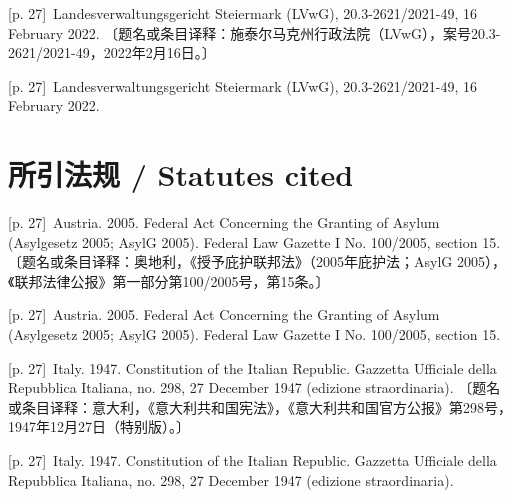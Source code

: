 \documentclass[10pt,a4paper]{article}
\begin{document}
\noindent\begin{minipage}{\textwidth}\begin{minipage}[t]{\dimexpr.5\textwidth-4mm\relax}{\scriptsize\color{gray} [p. 27]}\ Landesverwaltungsgericht Steiermark (LVwG), 20.3-2621/2021-49, 16 February 2022. 〔题名或条目译释：施泰尔马克州行政法院（LVwG），案号20.3-2621/2021-49，2022年2月16日。〕\par\end{minipage}\hfill\begin{minipage}[t]{\dimexpr.5\textwidth-4mm\relax}{\scriptsize\color{gray} [p. 27]}\ Landesverwaltungsgericht Steiermark (LVwG), 20.3-2621/2021-49, 16 February 2022.\par\end{minipage}\end{minipage}\par
{}\section*{所引法规 / Statutes cited}
\noindent\begin{minipage}{\textwidth}\begin{minipage}[t]{\dimexpr.5\textwidth-4mm\relax}{\scriptsize\color{gray} [p. 27]}\ Austria. 2005. Federal Act Concerning the Granting of Asylum (Asylgesetz 2005; AsylG 2005). Federal Law Gazette I No. 100/2005, section 15. 〔题名或条目译释：奥地利，《授予庇护联邦法》（2005年庇护法；AsylG 2005），《联邦法律公报》第一部分第100/2005号，第15条。〕\par\end{minipage}\hfill\begin{minipage}[t]{\dimexpr.5\textwidth-4mm\relax}{\scriptsize\color{gray} [p. 27]}\ Austria. 2005. Federal Act Concerning the Granting of Asylum (Asylgesetz 2005; AsylG 2005). Federal Law Gazette I No. 100/2005, section 15.\par\end{minipage}\end{minipage}\par
\noindent\begin{minipage}{\textwidth}\begin{minipage}[t]{\dimexpr.5\textwidth-4mm\relax}{\scriptsize\color{gray} [p. 27]}\ Italy. 1947. Constitution of the Italian Republic. Gazzetta Ufficiale della Repubblica Italiana, no. 298, 27 December 1947 (edizione straordinaria). 〔题名或条目译释：意大利，《意大利共和国宪法》，《意大利共和国官方公报》第298号，1947年12月27日（特别版）。〕\par\end{minipage}\hfill\begin{minipage}[t]{\dimexpr.5\textwidth-4mm\relax}{\scriptsize\color{gray} [p. 27]}\ Italy. 1947. Constitution of the Italian Republic. Gazzetta Ufficiale della Repubblica Italiana, no. 298, 27 December 1947 (edizione straordinaria).\par\end{minipage}\end{minipage}\par
\end{document}
